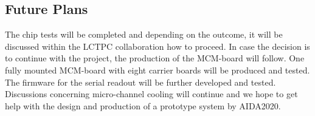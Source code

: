 \subsection{Future Plans}
The chip tests will be completed and depending on the outcome, it will be discussed within the LCTPC collaboration how to proceed. In case the decision is to continue with the project, the production of the MCM-board will follow. One fully mounted MCM-board with eight carrier boards will be produced and tested. The firmware for the serial readout will be further developed and tested. Discussions concerning micro-channel cooling will continue and we hope to get help with the design and production of a prototype system by AIDA2020.
